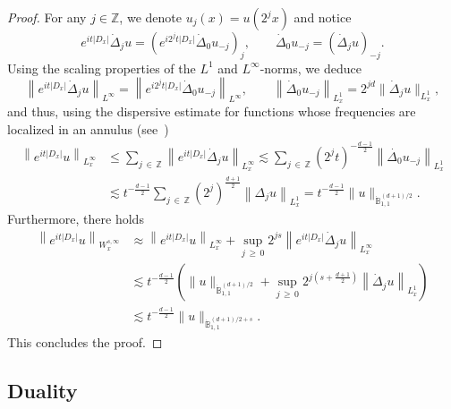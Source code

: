\documentclass[10pt]{amsart}
\theoremstyle{definition}\newtheorem{defi}[theo]{Definition}\newtheorem{rema}[theo]{Remark}\newtheorem{exam}[theo]{Example}\newtheorem{exem}[theo]{Example}\newtheorem{nota}[theo]{Notation}
\newcommand{\Z}{\mathbb{Z}}
\newcommand{\bbB}{\mathbb{B}}
\renewcommand*\le{\leqslant}
\renewcommand*\ge{\geqslant}
\begin{document}
\begin{proof}
For any $j \in \Z$, we denote $u_j(x) = u\left(2^j x \right)$ and notice
\[
e^{i t | D_x | } \dot{\Delta}_j u = \left(e^{i 2^j t | D_x | } \dot{\Delta}_0 u_{-j} \right)_j, \qquad \dot{\Delta}_0 u_{-j} = \left(\dot{\Delta}_j u \right)_{-j}.
\]
Using the scaling properties of the $L^1$ and $L^\infty$-norms, we deduce
\[
\left\| e^{i t | D_x | } \dot{\Delta}_j u \right\|_{L^\infty} = \left\| e^{i 2^j t | D_x | } \dot{\Delta}_0 u_{-j} \right\|_{L^\infty}, \qquad \left\| \dot{\Delta}_0 u_{-j} \right\|_{L^1_x} = 2^{j d } \| \dot{\Delta}_j u \|_{L^1_x},
\]
and thus, using the dispersive estimate for functions whose frequencies are localized in an annulus (see~\cite[Proposition~8.15]{BCD2011})
\begin{align*}
\left\| e^{i t | D_x | } u \right\|_{L^\infty_x} & \le \sum_{j\, \in\,\Z} \left\| e^{i t | D_x | } \dot{\Delta}_j u \right\|_{L^\infty_x} \lesssim \sum_{j\,\in\,\Z} \left(2^j t\right)^{-\frac{d-1}{2}} \left\| \dot{\Delta_0} u_{-j}\right\|_{L^1_x} \\
& \lesssim t^{-\frac{d-1}{2}} \sum_{j\,\in\,\Z} \left(2^j \right)^{\frac{d+1}{2}} \left\| \Delta_j u \right\|_{L^1_x} = t^{-\frac{d-1}{2}} \| u \|_{ \dot{\bbB}^{(d+1)/2}_{1,1} }.
\end{align*}
Furthermore, there holds
\begin{align*}
\left\| e^{i t | D_x | } u \right\|_{W^{s, \infty}_x} & \approx \left\| e^{i t | D_x | } u \right\|_{L^\infty_x} + \sup_{j\,\ge\,0} 2^{j s} \left\| e^{i t | D_x | } \dot{\Delta}_j u \right\|_{L^\infty_x} \\
& \lesssim t^{-\frac{d-1}{2}} \left(\| u \|_{ \dot{\bbB}^{(d+1)/2}_{1,1} } + \sup_{j\,\ge\,0} 2^{j \left(s+\frac{d+1}{2}\right) } \left\| \dot{\Delta}_j u\right\|_{L^1_x}\right) \\
& \lesssim t^{-\frac{d-1}{2}} \| u \|_{ \dot{\bbB}^{(d+1)/2 + s }_{1,1} }.
\end{align*}
This concludes the proof.
\end{proof}

\subsection{Duality}\label{scn:duality}
\end{document}

